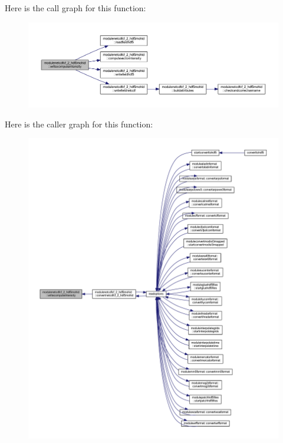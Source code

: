 Here is the call graph for this function\+:\nopagebreak
\begin{figure}[H]
\begin{center}
\leavevmode
\includegraphics[width=350pt]{namespacemodulenetcdfcf__2__hdf5mohid_a01bd6ffe3872c8015fc8cc1d24e90de8_cgraph}
\end{center}
\end{figure}
Here is the caller graph for this function\+:\nopagebreak
\begin{figure}[H]
\begin{center}
\leavevmode
\includegraphics[width=350pt]{namespacemodulenetcdfcf__2__hdf5mohid_a01bd6ffe3872c8015fc8cc1d24e90de8_icgraph}
\end{center}
\end{figure}
\mbox{\label{namespacemodulenetcdfcf__2__hdf5mohid_abb91469d951de000f7fa64d1cb05d626}} 

